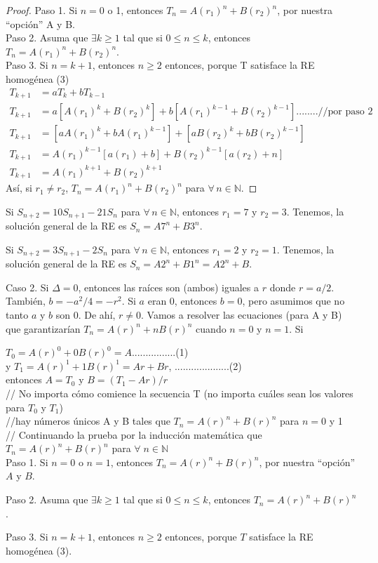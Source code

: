 \begin{proof}
Paso 1. Si $n=0$ o 1, entonces $T_n = A(r_1)^n + B(r_2)^n$, por nuestra ``opción'' A y B.\\
Paso 2. Asuma que $\exists k \geq 1$ tal que si $0\leq n \leq k$, entonces $T_n = A(r_1)^n + B(r_2)^n$.\\
Paso 3. Si $n= k+1$, entonces $n \geq 2$ entonces, porque T satisface la RE homogénea (3)\\

\begin{align*}
T_{k+1}
&=aT_{k}+bT_{k-1}\\
T_{k+1}
&=a\left[A(r_1)^k + B(r_2)^k\right]+b\left[A(r_1)^{k-1} + B(r_2)^{k-1}\right]........//\text{por paso 2}\\
T_{k+1}
&=\left[aA(r_1)^k+bA(r_1)^{k-1}\right]+[aB(r_2)^k+bB(r_2)^{k-1}]\\
T_{k+1}
&=A(r_1)^{k-1}[a(r_1)+b]+B(r_2)^{k-1}[a(r_2)+n]\\
T_{k+1}
&= A(r_1)^{k+1}+B(r_2)^{k+1}
\end{align*}
Así, si $r_{1}\neq r_{2}$, $T_{n}=A(r_1)^n+B(r_2)^n$ para $\forall\,n\in\mathds{N}$.
\end{proof}
\begin{example}{}
Si $S_{n+2}=10S_{n+1}-21S_{n}$ para $\forall\, n\in\mathds{N}$, entonces $r_1 = 7$ y $r_2 = 3$. Tenemos, la solución general de la RE es $S_{n}=A7^n+B3^{n}$.
\end{example}

\begin{example}{}
Si $S_{n+2}=3S_{n+1}-2S_{n}$ para $\forall\,n\in\mathds{N}$, entonces $r_{1}=2$ y $r_{2}=1$. Tenemos, la solución general de la RE es $S_n= A2^n+B1^{n}=A2^n+B$.

Caso 2. Si $\Delta=0$, entonces las raíces son (ambos) iguales a $r$ donde $r=a/2$. También, $b=-a^2/4=-r^2$. Si $a$ eran $0$, entonces $b=0$, pero asumimos que no tanto $a$ y $b$ son 0. De ahí, $r \neq 0$. Vamos a resolver las ecuaciones (para A y B) que garantizarían $T_n = A(r)^n + nB(r)^n$ cuando $n = 0$ y $n = 1$. Si

$T_0 = A(r)^0 + 0B(r)^0 = A$................(1)\\
y $T_1 = A(r)^1 + 1B(r)^1 = Ar + Br$, ....................(2)\\

entonces $A= T_0$ y $B=(T_1 - Ar)/r$\\
// No importa cómo comience la secuencia T (no importa cuáles sean los valores para $T_0$ y $T_1$)\\
//hay números únicos A y B tales que $T_n = A(r)^n + B(r)^n$ para $n = 0$ y 1\\
// Continuando la prueba por la inducción matemática que $T_n= A(r)^n + B(r)^n$ para $\forall \; n \in \mathbb{N}$\\

Paso 1. Si $n=0$ o $n=1$, entonces $T_n=A(r)^n+B(r)^n$, por nuestra ``opción'' $A$ y $B$.

Paso 2. Asuma que $\exists k\geq 1$ tal que si $0\leq n\leq k$, entonces $T_n=A(r)^n+B(r)^n$.

Paso 3. Si $n= k+1$, entonces $n\geq 2$ entonces, porque $T$ satisface la RE homogénea (3).
\end{example}

